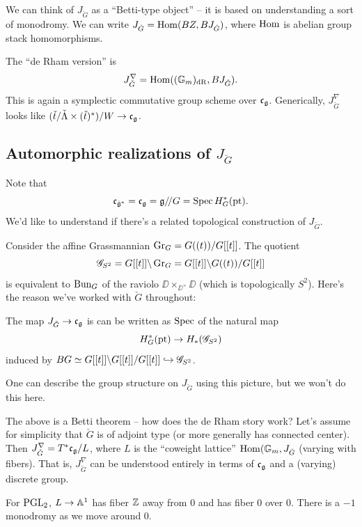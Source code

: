\documentclass{article}
\begin{document}
We can think of $J_{\check{G}}$ as a ``Betti-type object'' -- it is based on understanding a sort of monodromy.
We can write $J_{\check{G}} = \Hom(BZ, BJ_{\check{G}})$, where $\Hom$ is abelian group stack homomorphisms.

The ``de Rham version'' is 
\[
  J_{\check{G}}^\nabla = \Hom((\GG_m)_\dR, BJ_{\check{G}}).
\]
This is again a symplectic commutative group scheme over $\cfr_\gfr$.
Generically, $J_{\check{G}}^\nabla$ looks like $(\check{t} / \check{\Lambda} \times (\check{t})^*) / W \to \cfr_{\gfr}$.

\subsection{Automorphic realizations of $J_{\check{G}}$}

Note that 
\[
  \cfr_{\check{\gfr}^*} = \cfr_{\gfr} = \gfr \sslash G = \Spec H^*_G(\pt).
\]
We'd like to understand if there's a related topological construction of $J_{\check{G}}$.

Consider the affine Grassmannian $\Gr_G = G((t)) / G[[t]]$.
The quotient 
\[
  \Gsc_{S^2} = G[[t]] \bs \Gr_G = G[[t]] \bs G((t)) / G[[t]]
\]
is equivalent to $\Bun_G$ of the raviolo $\DD \times_{\DD^\times} \DD$ (which is topologically $S^2$).
Here's the reason we've worked with $\check{G}$ throughout:

\begin{thm}
  The map $J_{\check{G}} \to \cfr_\gfr$ is can be written as $\Spec$ of the natural map
  \[
    H_G^*(\pt) \to H_*(\Gsc_{S^2})
  \]
  induced by $BG \simeq G[[t]] \bs G[[t]] / G[[t]] \hookrightarrow \Gsc_{S^2}$.
\end{thm}

\begin{rmk}
  One can describe the group structure on $J_{\check{G}}$ using this picture, but we won't do this here.
\end{rmk}

The above is a Betti theorem -- how does the de Rham story work?
Let's assume for simplicity that $\check{G}$ is of adjoint type (or more generally has connected center).
Then $J_{\check{G}}^\nabla = T^* \cfr_\gfr / L$, where $L$ is the ``coweight lattice'' $\Hom(\GG_m, J_{\check{G}}$ (varying with fibers).
That is, $J_{\check{G}}^\nabla$ can be understood entirely in terms of $\cfr_\gfr$ and a (varying) discrete group.

\begin{ex}
  For $\PGL_2$, $L \to \AA^1$ has fiber $\ZZ$ away from $0$ and has fiber $0$ over $0$.
  There is a $-1$ monodromy as we move around $0$.
\end{ex}
\end{document}
